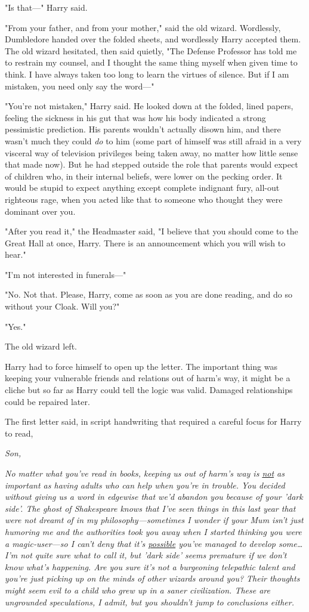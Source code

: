 "Is that---" Harry said.

"From your father, and from your mother," said the old wizard. Wordlessly, 
Dumbledore handed over the folded sheets, and wordlessly Harry accepted them. 
The old wizard hesitated, then said quietly, "The Defense Professor has told me 
to restrain my counsel, and I thought the same thing myself when given time to 
think. I have always taken too long to learn the virtues of silence. But if I 
am mistaken, you need only say the word---"

"You're not mistaken," Harry said. He looked down at the folded, lined papers, 
feeling the sickness in his gut that was how his body indicated a strong 
pessimistic prediction. His parents wouldn't actually disown him, and there 
wasn't much they could \emph{do} to him (some part of himself was still afraid 
in a very visceral way of television privileges being taken away, no matter how 
little sense that made now). But he had stepped outside the role that parents 
would expect of children who, in their internal beliefs, were lower on the 
pecking order. It would be stupid to expect anything except complete indignant 
fury, all-out righteous rage, when you acted like that to someone who thought 
they were dominant over you.

"After you read it," the Headmaster said, "I believe that you should come to 
the Great Hall at once, Harry. There is an announcement which you will wish to 
hear."

"I'm not interested in funerals---"

"No. Not that. Please, Harry, come as soon as you are done reading, and do so 
without your Cloak. Will you?"

"Yes."

The old wizard left.

Harry had to force himself to open up the letter. The important thing was 
keeping your vulnerable friends and relations out of harm's way, it might be a 
cliche but so far as Harry could tell the logic was valid. Damaged 
relationships could be repaired later.

The first letter said, in script handwriting that required a careful focus for 
Harry to read,

\emph{Son,}

\emph{No matter what you've read in books, keeping us out of harm's way is 
\underline{not} as important as having adults who can help when you're in 
trouble. You decided without giving us a word in edgewise that we'd abandon you 
because of your 'dark side'. The ghost of Shakespeare knows that I've seen 
things in this last year that were not dreamt of in my philosophy---sometimes I 
wonder if your Mum isn't just humoring me and the authorities took you away 
when I started thinking you were a magic-user---so I can't deny that it's 
\underline{possible} you've managed to develop some{\ldots} I'm not quite sure 
what to call it, but 'dark side' seems premature if we don't know what's 
happening. Are you sure it's not a burgeoning telepathic talent and you're just 
picking up on the minds of other wizards around you? Their thoughts might seem 
evil to a child who grew up in a saner civilization. These are ungrounded 
speculations, I admit, but you shouldn't jump to conclusions either.}

